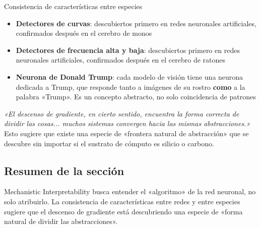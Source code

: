 \begin{knowledgebox}{Consistencia de características entre especies}
\begin{itemize}
    \item \textbf{Detectores de curvas}: descubiertos primero en redes neuronales artificiales, confirmados después en el cerebro de monos
    \item \textbf{Detectores de frecuencia alta y baja}: descubiertos primero en redes neuronales artificiales, confirmados después en el cerebro de ratones
    \item \textbf{Neurona de Donald Trump}: cada modelo de visión tiene una neurona dedicada a Trump, que responde tanto a imágenes de su rostro \textbf{como} a la palabra «Trump». Es un concepto abstracto, no solo coincidencia de patrones
\end{itemize}

\textit{«El descenso de gradiente, en cierto sentido, encuentra la forma correcta de dividir las cosas... muchos sistemas convergen hacia las mismas abstracciones.»} Esto sugiere que existe una especie de «frontera natural de abstracción» que se descubre sin importar si el sustrato de cómputo es silicio o carbono.
\end{knowledgebox}

\subsection{Resumen de la sección}

Mechanistic Interpretability busca entender el «algoritmo» de la red neuronal, no solo atribuirlo. La consistencia de características entre redes y entre especies sugiere que el descenso de gradiente está descubriendo una especie de «forma natural de dividir las abstracciones».
